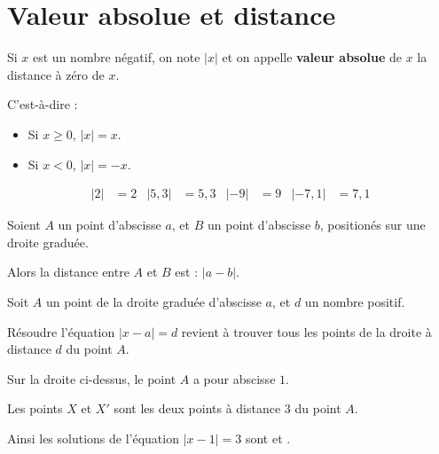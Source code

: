 \documentclass[
	10pt,
	classe=$2^{de}$,
]{coursclass}
\begin{document}
\section{Valeur absolue et distance}

\begin{definition}
	Si $x$ est un nombre négatif, on note $|x|$ et on appelle \textbf{valeur absolue} de $x$ la distance à zéro de $x$.

	C'est-à-dire :
	\begin{itemize}
		\item Si $x ≥ 0$, $|x| = x$.
		\item Si $x < 0$, $|x| = -x$.
	\end{itemize}
\end{definition}

\begin{exemple}
	\begin{align*}
		|2| & = 2 & |5,3| & = 5,3 & |-9| & = 9 & |-7,1| & = 7,1
	\end{align*}
\end{exemple}

\begin{definition}
	Soient $A$ un point d'abscisse $a$, et $B$ un point d'abscisse $b$, positionés sur une droite graduée.

	Alors la distance entre $A$ et $B$ est : $|a - b|$.
\end{definition}

\begin{propriete}
	Soit $A$ un point de la droite graduée d'abscisse $a$, et $d$ un nombre positif.

	Résoudre l'équation $|x - a| = d$ revient à trouver tous les points de la droite à distance $d$ du point $A$.
\end{propriete}

\begin{exemple}
	\begin{center}
	\end{center}

	Sur la droite ci-dessus, le point $A$ a pour abscisse $1$.

	Les points $X$ et $X'$ sont les deux points à distance $3$ du point $A$.

	Ainsi les solutions de l'équation $|x-1| = 3$ sont  et .
\end{exemple}
\end{document}
